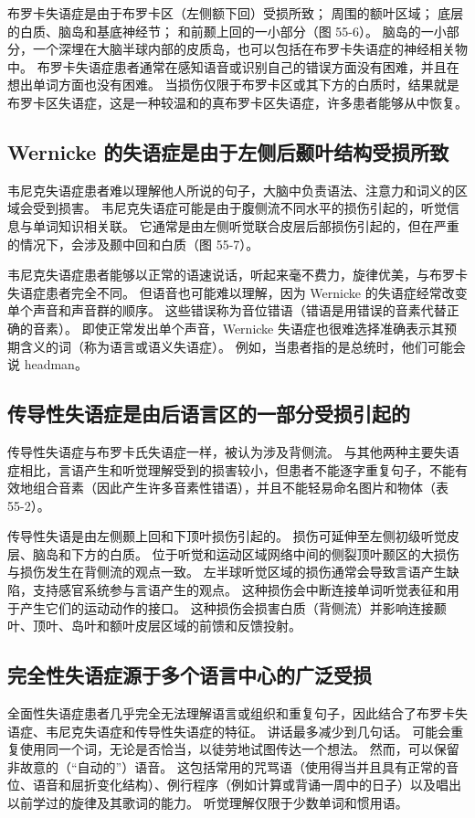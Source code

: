 布罗卡失语症是由于布罗卡区（左侧额下回）受损所致； 周围的额叶区域； 底层的白质、脑岛和基底神经节； 和前颞上回的一小部分（图 55-6）。 脑岛的一小部分，一个深埋在大脑半球内部的皮质岛，也可以包括在布罗卡失语症的神经相关物中。 布罗卡失语症患者通常在感知语音或识别自己的错误方面没有困难，并且在想出单词方面也没有困难。 当损伤仅限于布罗卡区或其下方的白质时，结果就是布罗卡区失语症，这是一种较温和的真布罗卡区失语症，许多患者能够从中恢复。

\subsection{Wernicke 的失语症是由于左侧后颞叶结构受损所致}

韦尼克失语症患者难以理解他人所说的句子，大脑中负责语法、注意力和词义的区域会受到损害。 韦尼克失语症可能是由于腹侧流不同水平的损伤引起的，听觉信息与单词知识相关联。 它通常是由左侧听觉联合皮层后部损伤引起的，但在严重的情况下，会涉及颞中回和白质（图 55-7）。

韦尼克失语症患者能够以正常的语速说话，听起来毫不费力，旋律优美，与布罗卡失语症患者完全不同。 但语音也可能难以理解，因为 Wernicke 的失语症经常改变单个声音和声音群的顺序。 这些错误称为音位错语（错语是用错误的音素代替正确的音素）。 即使正常发出单个声音，Wernicke 失语症也很难选择准确表示其预期含义的词（称为语言或语义失语症）。 例如，当患者指的是总统时，他们可能会说 headman。

\subsection{传导性失语症是由后语言区的一部分受损引起的}
传导性失语症与布罗卡氏失语症一样，被认为涉及背侧流。 与其他两种主要失语症相比，言语产生和听觉理解受到的损害较小，但患者不能逐字重复句子，不能有效地组合音素（因此产生许多音素性错语），并且不能轻易命名图片和物体（表 55-2）。

传导性失语是由左侧颞上回和下顶叶损伤引起的。 损伤可延伸至左侧初级听觉皮层、脑岛和下方的白质。 位于听觉和运动区域网络中间的侧裂顶叶颞区的大损伤与损伤发生在背侧流的观点一致。 左半球听觉区域的损伤通常会导致言语产生缺陷，支持感官系统参与言语产生的观点。 这种损伤会中断连接单词听觉表征和用于产生它们的运动动作的接口。 这种损伤会损害白质（背侧流）并影响连接颞叶、顶叶、岛叶和额叶皮层区域的前馈和反馈投射。

\subsection{完全性失语症源于多个语言中心的广泛受损}
全面性失语症患者几乎完全无法理解语言或组织和重复句子，因此结合了布罗卡失语症、韦尼克失语症和传导性失语症的特征。 讲话最多减少到几句话。 可能会重复使用同一个词，无论是否恰当，以徒劳地试图传达一个想法。 然而，可以保留非故意的（“自动的”）语音。 这包括常用的咒骂语（使用得当并且具有正常的音位、语音和屈折变化结构）、例行程序（例如计算或背诵一周中的日子）以及唱出以前学过的旋律及其歌词的能力。 听觉理解仅限于少数单词和惯用语。

